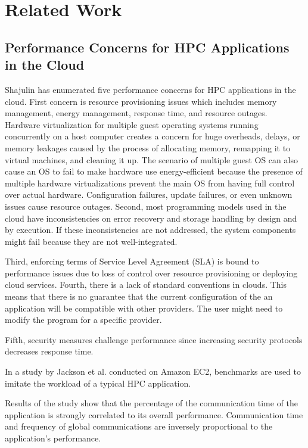 \section {Related Work}
    
\subsection{Performance Concerns for HPC Applications in the Cloud}

Shajulin \cite {8521133920130201} has enumerated five performance concerns for HPC applications in the cloud. First concern is resource provisioning issues which includes memory management, energy management, response time, and resource outages.  Hardware virtualization for multiple guest operating systems running concurrently on a host computer creates a concern for huge overheads, delays, or memory leakages caused by the process of allocating memory, remapping it to virtual machines, and cleaning it up. The scenario of multiple guest OS can also cause an OS to fail to make hardware use energy-efficient because the presence of multiple hardware virtualizations prevent the main OS from having full control over actual hardware. Configuration failures, update failures, or even unknown issues cause resource outages. Second, most programming models used in the cloud have inconsistencies on error recovery and storage handling by design and by execution. If these inconsistencies are not addressed, the system components might fail because they are not well-integrated.        

Third, enforcing terms of Service Level Agreement (SLA) is bound to performance issues due to loss of control over resource provisioning or deploying cloud services. Fourth, there is a lack of standard conventions in clouds. This means that there is no guarantee that the current configuration of the an application will be compatible with other providers. The user might need to modify the program for a specific provider.  
         
Fifth, security measures challenge performance since increasing security protocols decreases response time.

In a study by Jackson et al.\cite{CloudCom2010} conducted on Amazon EC2, benchmarks are used to imitate the workload of a typical HPC application.

Results of the study show that the percentage of the communication time of the application is strongly correlated to its overall performance. Communication time and frequency of global communications are inversely proportional to the application's performance.

